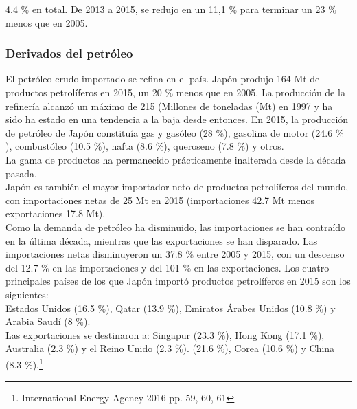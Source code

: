 \documentclass[]{article}
\begin{document}
4.4 $\%$ en total. De 2013 a 2015, se redujo en un 11,1 $\%$ para terminar un 23 $\%$ menos que en 2005.\citep{InternationalEnergyAgency2016}\\


\subsubsection{Derivados del petróleo}

El petróleo crudo importado se refina en el país. Japón produjo 164 Mt de productos petrolíferos en
2015, un 20 $\%$ menos que en 2005. La producción de la refinería alcanzó un máximo de 215 (Millones de toneladas (Mt) en 1997 y ha sido
ha estado en una tendencia a la baja desde entonces. En 2015, la producción de petróleo de Japón constituía gas
y gasóleo (28 $\%$), gasolina de motor (24.6 $\%$ ), combustóleo (10.5 $\%$), nafta (8.6 $\%$), queroseno (7.8 $\%$) y otros.\\


La gama de productos ha permanecido prácticamente inalterada desde la década pasada.\citep{InternationalEnergyAgency2016}\\ %

Japón es también el mayor importador neto de productos petrolíferos del mundo, con importaciones netas de
25 Mt en 2015 (importaciones 42.7 Mt menos exportaciones 17.8 Mt).\\

 Como la demanda de petróleo ha disminuido,
las importaciones se han contraído en la última década, mientras que las exportaciones se han disparado. Las importaciones netas
disminuyeron un 37.8 $\%$ entre 2005 y 2015, con un descenso del 12.7 $\%$ en las importaciones y del 101 $\%$ en las exportaciones. Los cuatro principales países de los que Japón importó productos petrolíferos en 2015 son los siguientes:\\

Estados Unidos (16.5 $\%$), Qatar (13.9 $\%$), Emiratos Árabes Unidos (10.8 $\%$) y Arabia Saudí
(8 $\%$). \\

Las exportaciones se destinaron a: Singapur (23.3 $\%$), Hong Kong (17.1 $\%$), Australia (2.3 $\%$) y el Reino Unido (2.3 $\%$).
(21.6 $\%$), Corea (10.6 $\%$) y China (8.3 $\%$).\citep{InternationalEnergyAgency2016}\footnote{International Energy Agency 2016 pp. 59, 60, 61}\\
\end{document}
